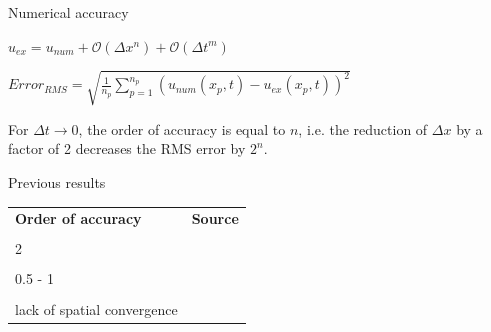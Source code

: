 \documentclass[mathserif,professionalfont,hyperref={pdfpagelabels=false}]{beamer}
\begin{document}
\begin{frame}{Numerical accuracy}
\begin{tcolorbox}[colback=red!5,colframe=red!50!black,title=Numerical Approximation]
$u_{ex} = u_{num} + \mathcal{O}(\Delta x^n) + \mathcal{O}(\Delta t^m)$ %
\end{tcolorbox}
\begin{tcolorbox}[colback=red!5,colframe=red!50!black,title=RMS Error]
$Error_{RMS} = \sqrt{\frac{1}{n_p} \sum_{p=1}^{n_p}\left(u_{num}(x_p,t) - u_{ex}(x_p,t)\right)^2}$
\end{tcolorbox}
\begin{tcolorbox}[colback=blue!5,colframe=blue!40!black,title=Accuracy in displacement]
For $\Delta t \to 0$, the order of accuracy is equal to $n$, i.e. the reduction of $\Delta x$ by a factor of 2 decreases the RMS error by $2^n$.
\end{tcolorbox}
\end{frame}

\begin{frame}{Previous results}
\begin{tcolorbox}[colback=red!5,colframe=red!50!black]
\begin{tabular}{l l}
\textbf{Order of accuracy} & \textbf{Source}\\
& \\
 2 & \citet{gong, steffen}\\
& \\
 0.5 - 1 & \citet{tran}\\
& \\
 lack of spatial convergence & \citet{gong, steffen} \\
\end{tabular}
\end{tcolorbox} 
\end{frame}
\end{document}
